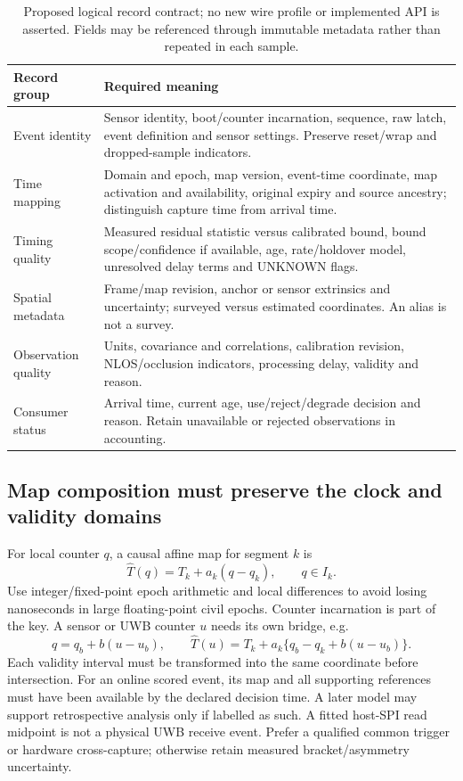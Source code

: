\documentclass[11pt,letterpaper]{article}
\begin{document}
\begin{table}[ht]\centering\small
\caption{Proposed logical record contract; no new wire profile or implemented API is asserted. Fields may be referenced through immutable metadata rather than repeated in each sample.}
\begin{tabular}{@{}L{37mm}L{112mm}@{}}\toprule
Record group & Required meaning\\\midrule
Event identity &Sensor identity, boot/counter incarnation, sequence, raw latch, event definition and sensor settings. Preserve reset/wrap and dropped-sample indicators.\\\addlinespace
Time mapping &Domain and epoch, map version, event-time coordinate, map activation and availability, original expiry and source ancestry; distinguish capture time from arrival time.\\\addlinespace
Timing quality &Measured residual statistic versus calibrated bound, bound scope/confidence if available, age, rate/holdover model, unresolved delay terms and UNKNOWN flags.\\\addlinespace
Spatial metadata &Frame/map revision, anchor or sensor extrinsics and uncertainty; surveyed versus estimated coordinates. An alias is not a survey.\\\addlinespace
Observation quality &Units, covariance and correlations, calibration revision, NLOS/occlusion indicators, processing delay, validity and reason.\\\addlinespace
Consumer status &Arrival time, current age, use/reject/degrade decision and reason. Retain unavailable or rejected observations in accounting.\\\bottomrule
\end{tabular}
\end{table}

\subsection{Map composition must preserve the clock and validity domains}
For local counter $q$, a causal affine map for segment $k$ is
\begin{equation}
 \hat T(q)=T_k+a_k(q-q_k),\qquad q\in I_k.\label{eq:map}
\end{equation}
Use integer/fixed-point epoch arithmetic and local differences to avoid losing nanoseconds in large floating-point civil epochs. Counter incarnation is part of the key. A sensor or UWB counter $u$ needs its own bridge, e.g.
\begin{equation}
 q=q_b+b(u-u_b),\qquad
 \hat T(u)=T_k+a_k\{q_b-q_k+b(u-u_b)\}.\label{eq:bridge}
\end{equation}
Each validity interval must be transformed into the same coordinate before intersection. For an online scored event, its map and all supporting references must have been available by the declared decision time. A later model may support retrospective analysis only if labelled as such. A fitted host-SPI read midpoint is not a physical UWB receive event. Prefer a qualified common trigger or hardware cross-capture; otherwise retain measured bracket/asymmetry uncertainty.
\end{document}
